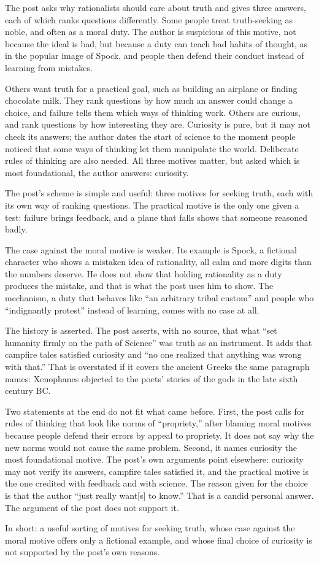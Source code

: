 \begin{afterword}
\summaryhead

The post asks why rationalists should care about truth and gives three answers, each of which ranks questions differently. Some people treat truth-seeking as noble, and often as a moral duty. The author is suspicious of this motive, not because the ideal is bad, but because a duty can teach bad habits of thought, as in the popular image of Spock, and people then defend their conduct instead of learning from mistakes.

Others want truth for a practical goal, such as building an airplane or finding chocolate milk. They rank questions by how much an answer could change a choice, and failure tells them which ways of thinking work. Others are curious, and rank questions by how interesting they are. Curiosity is pure, but it may not check its answers; the author dates the start of science to the moment people noticed that some ways of thinking let them manipulate the world. Deliberate rules of thinking are also needed. All three motives matter, but asked which is most foundational, the author answers: curiosity.

\responsehead

The post's scheme is simple and useful: three motives for seeking truth, each with its own way of ranking questions. The practical motive is the only one given a test: failure brings feedback, and a plane that falls shows that someone reasoned badly.

The case against the moral motive is weaker. Its example is Spock, a fictional character who shows a mistaken idea of rationality, all calm and more digits than the numbers deserve. He does not show that holding rationality as a duty produces the mistake, and that is what the post uses him to show. The mechanism, a duty that behaves like ``an arbitrary tribal custom'' and people who ``indignantly protest'' instead of learning, comes with no case at all.

The history is asserted. The post asserts, with no source, that what ``set humanity firmly on the path of Science'' was truth as an instrument. It adds that campfire tales satisfied curiosity and ``no one realized that anything was wrong with that.'' That is overstated if it covers the ancient Greeks the same paragraph names: Xenophanes objected to the poets' stories of the gods in the late sixth century BC.

Two statements at the end do not fit what came before. First, the post calls for rules of thinking that look like norms of ``propriety,'' after blaming moral motives because people defend their errors by appeal to propriety. It does not say why the new norms would not cause the same problem. Second, it names curiosity the most foundational motive. The post's own arguments point elsewhere: curiosity may not verify its answers, campfire tales satisfied it, and the practical motive is the one credited with feedback and with science. The reason given for the choice is that the author ``just really want[s] to know.'' That is a candid personal answer. The argument of the post does not support it.

In short: a useful sorting of motives for seeking truth, whose case against the moral motive offers only a fictional example, and whose final choice of curiosity is not supported by the post's own reasons.
\end{afterword}
